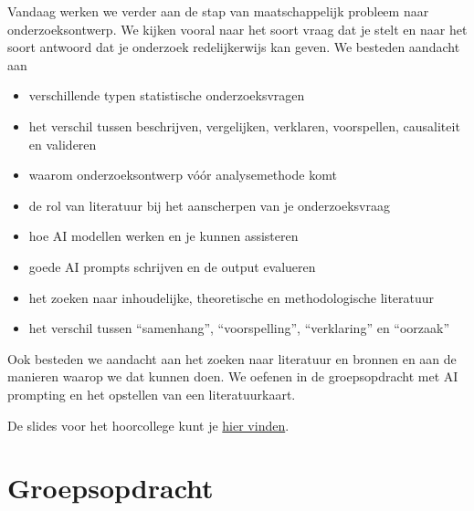 \documentclass[
  letterpaper,
  DIV=11,
  numbers=noendperiod]{scrreprt}
\providecommand{\tightlist}{%
  \setlength{\itemsep}{0pt}\setlength{\parskip}{0pt}}
\begin{document}
\begin{tcolorbox}[enhanced jigsaw, arc=.35mm, bottomrule=.15mm, bottomtitle=1mm, breakable, colback=white, colbacktitle=quarto-callout-tip-color!10!white, colframe=quarto-callout-tip-color-frame, coltitle=black, left=2mm, leftrule=.75mm, opacityback=0, opacitybacktitle=0.6, rightrule=.15mm, title=\textcolor{quarto-callout-tip-color}{\faLightbulb}\hspace{0.5em}{Hoorcollege 18 juni 2026}, titlerule=0mm, toprule=.15mm, toptitle=1mm]

Vandaag werken we verder aan de stap van maatschappelijk probleem naar
onderzoeksontwerp. We kijken vooral naar het soort vraag dat je stelt en
naar het soort antwoord dat je onderzoek redelijkerwijs kan geven. We
besteden aandacht aan

\begin{itemize}
\tightlist
\item
  verschillende typen statistische onderzoeksvragen
\item
  het verschil tussen beschrijven, vergelijken, verklaren, voorspellen,
  causaliteit en valideren
\item
  waarom onderzoeksontwerp vóór analysemethode komt
\item
  de rol van literatuur bij het aanscherpen van je onderzoeksvraag
\item
  hoe AI modellen werken en je kunnen assisteren
\item
  goede AI prompts schrijven en de output evalueren
\item
  het zoeken naar inhoudelijke, theoretische en methodologische
  literatuur
\item
  het verschil tussen ``samenhang'', ``voorspelling'', ``verklaring'' en
  ``oorzaak''
\end{itemize}

Ook besteden we aandacht aan het zoeken naar literatuur en bronnen en
aan de manieren waarop we dat kunnen doen. We oefenen in de
groepsopdracht met AI prompting en het opstellen van een
literatuurkaart.

De slides voor het hoorcollege kunt je \href{slides/lec-2.html}{hier
vinden}.

\end{tcolorbox}

\section{Groepsopdracht}\label{groepsopdracht-1}
\end{document}
